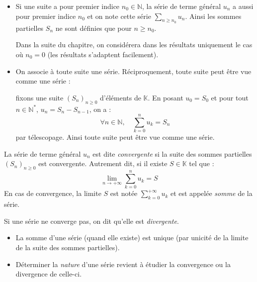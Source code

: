 \documentclass[french,11pt,twoside]{VcCours}
\newcommand{\Sum}[2]{\ensuremath{\textstyle{\sum\limits_{#1}^{#2}}}}
\begin{document}
\begin{Remarques}{}
	\begin{itemize}
\item Si une suite a pour premier indice $n_0 \in \mathbb{N}$, la série de terme général $u_n$ a aussi pour premier indice $n_0$ et on note cette série $\Sum{n \geq n_0}{} u_n$. Ainsi les sommes partielles $S_n$ ne sont définies que pour $n \geq n_0$. 

\medskip

Dans la suite du chapitre, on considérera dans les résultats uniquement le cas où $n_0=0$ (les résultats s'adaptent facilement).
\item On associe à toute suite une série. Réciproquement, toute suite peut être vue comme une série :


fixons une suite $(S_n)_{n \geq 0}$ d'éléments de $\mathbb{K}$. En posant $u_0=S_0$ et pour tout $n \in \mathbb{N}^*$, $u_n = S_n - S_{n -1}$, on a :
$$ \forall n \in \mathbb{N}, \quad \sum_{k=0}^n u_k = S_n$$
par télescopage. Ainsi toute suite peut être vue comme une série.


\end{itemize}
\end{Remarques}

\begin{Definition}{}
La série de terme général $u_n$ est dite \emph{convergente} si la suite des sommes partielles $(S_n)_{n \geq 0}$ est convergente. Autrement dit, si il existe $S \in \mathbb{K}$ tel que :
$$ \lim_{n \rightarrow + \infty} \sum_{k=0}^n u_k = S $$
En cas de convergence, la limite $S$ est notée $\Sum{k=0}{+ \infty} u_k$ et est appelée \emph{somme} de la série.
\end{Definition}

\begin{Definition}{} Si une série ne converge pas, on dit qu'elle est \emph{divergente}.
\end{Definition}

\begin{Remarques}{}
	\begin{itemize}
\item La somme d'une série (quand elle existe) est unique (par unicité de la limite de la suite des sommes partielles).
\item Déterminer la \emph{nature} d'une série revient à étudier la convergence ou la divergence de celle-ci.
\end{itemize}
\end{Remarques}
\end{document}
